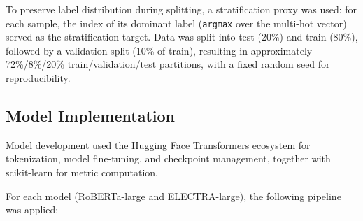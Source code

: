 To preserve label distribution during splitting, a stratification proxy was used: for each sample, the index of its dominant label (\texttt{argmax} over the multi-hot vector) served as the stratification target. Data was split into test (20\%) and train (80\%), followed by a validation split (10\% of train), resulting in approximately 72\%/8\%/20\% train/validation/test partitions, with a fixed random seed for reproducibility.

\subsection{Model Implementation}

Model development used the Hugging Face Transformers ecosystem \cite{wolf2020transformers} for tokenization, model fine-tuning, and checkpoint management, together with scikit-learn \cite{pedregosa2011scikit} for metric computation.

For each model (\acs{RoBERTa}-large and \acs{ELECTRA}-large), the following pipeline was applied:

